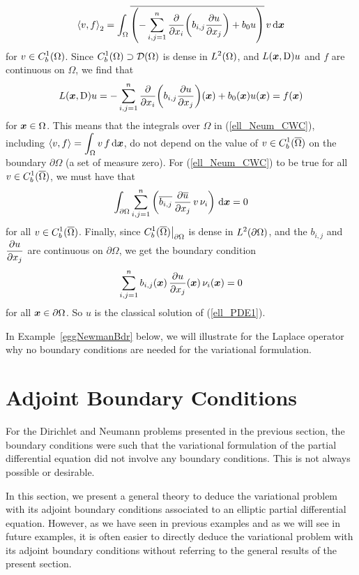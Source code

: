 \[
\ps{v}{f}_2 = \int_\Omega \overline{\left(-
\sum_{i,j=1}^n \pdfdx{\left( b_{i,j} \pdydx{u}{x_j} \right)}{x_i}
+ b_0 u \right)} \, v \dx{\VEC{x}}
\]
for $\DS v \in C^{1}_b(\Omega)$.
Since $\DS C^{1}_b(\Omega) \supset \DD(\Omega)$ is dense in
$\DS L^2(\Omega)$, and $L(\VEC{x},\diff)u$ and $f$ are
continuous on $\Omega$, we find that
\begin{equation} \label{ell_Neum_CWCB}
L(\VEC{x}, \diff)u = - \sum_{i,j=1}^n
\pdfdx{\left( b_{i,j} \pdydx{u}{x_j} \right)}{x_i}(\VEC{x})
+ b_0(\VEC{x}) u(\VEC{x}) = f(\VEC{x})
\end{equation}
for $\VEC{x} \in \Omega$.  This means that
the integrals over $\Omega$ in (\ref{ell_Neum_CWC}), including
$\DS \ps{v}{f} = \int_\Omega v\,f \dx{\VEC{x}}$, do not
depend on the value of $\DS v \in C^1_b(\overline{\Omega})$ on the
boundary $\partial \Omega$ (a set of measure zero).  For
(\ref{ell_Neum_CWC}) to be true for all
$\DS v \in C^1_b(\overline{\Omega})$,
we must have that
\[
\int_{\partial \Omega}
\sum_{i,j=1}^n \left( \overline{b_{i,j}}\,\pdydx{\overline{u}}{x_j}
\,v \, \nu_i \right) \dx{\VEC{x}} = 0
\]
for all $\DS v \in C^{1}_b(\overline{\Omega})$.
Finally, since $\DS C_b^1(\overline{\Omega})\big|_{\partial \Omega}$
is dense in $\DS L^2(\partial \Omega)$, and the $b_{i,j}$ and
$\DS \pdydx{u}{x_j}$ are continuous on $\partial \Omega$, we
get the boundary condition
\begin{equation} \label{ell_rm_bdr_Neum}
\sum_{i,j=1}^n b_{i,j}(\VEC{x})\,\pdydx{u}{x_j}(\VEC{x})\,
\nu_i(\VEC{x}) = 0
\end{equation}
for all $\VEC{x} \in \partial \Omega$.
So $u$ is the classical solution of (\ref{ell_PDE1}).

In Example~\ref{eggNewmanBdr} below, we will illustrate for the
Laplace operator why no boundary conditions are needed for the
variational formulation.

\section{Adjoint Boundary Conditions}

For the Dirichlet and Neumann problems presented in the previous
section, the boundary conditions were such that the variational
formulation of the partial differential equation did not involve any
boundary conditions.  This is not always possible or desirable.

In this section, we present a general theory to deduce the variational
problem with its adjoint boundary conditions associated to an elliptic partial
differential equation.  However, as we have seen in previous examples
and as we will see in future examples, it is often easier to directly 
deduce the variational problem with its adjoint boundary conditions
without referring to the general results of the present section.

